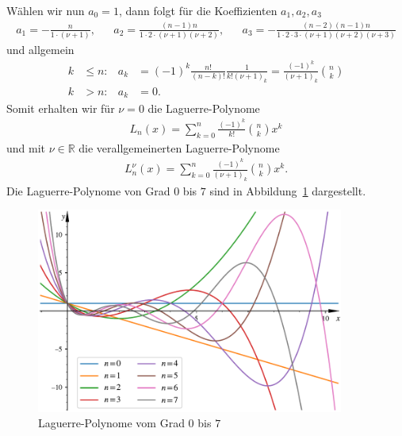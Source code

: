 Wählen wir nun $a_0 = 1$, dann folgt für die Koeffizienten $a_1, a_2, a_3$
\begin{align*}
a_1
=
-\frac{n}{1 \cdot (\nu + 1)}
, &  &
a_2
=
\frac{(n-1)n}{1 \cdot 2 \cdot (\nu + 1)(\nu + 2)}
, &  &
a_3
=
-\frac{(n-2)(n-1)n}{1 \cdot 2 \cdot 3 \cdot (\nu + 1)(\nu + 2)(\nu + 3)}
\end{align*}
und allgemein
\begin{align*}
k
  & \leq
n:
  &
a_k
  & =
(-1)^k \frac{n!}{(n-k)!} \frac{1}{k!(\nu + 1)_k}
=
\frac{(-1)^k}{(\nu + 1)_k} \binom{n}{k}
\\
k & >n:
  &
a_k
  & =
0.
\end{align*}
Somit erhalten wir für $\nu = 0$ die Laguerre-Polynome
\begin{align}
L_n(x)
=
\sum_{k=0}^{n} \frac{(-1)^k}{k!} \binom{n}{k} x^k
\label{laguerre:polynom}
\end{align}
und mit $\nu \in \mathbb{R}$ die verallgemeinerten Laguerre-Polynome
\begin{align}
L_n^\nu(x)
=
\sum_{k=0}^{n} \frac{(-1)^k}{(\nu + 1)_k} \binom{n}{k} x^k.
\label{laguerre:allg_polynom}
\end{align}
Die Laguerre-Polynome von Grad $0$ bis $7$ sind in
Abbildung~\ref{laguerre:fig:polyeval} dargestellt.
\begin{figure}
\centering
\includegraphics[width=0.9\textwidth]{papers/laguerre/images/laguerre_poly.pdf}
\caption{Laguerre-Polynome vom Grad $0$ bis $7$}
\label{laguerre:fig:polyeval}
\end{figure}

